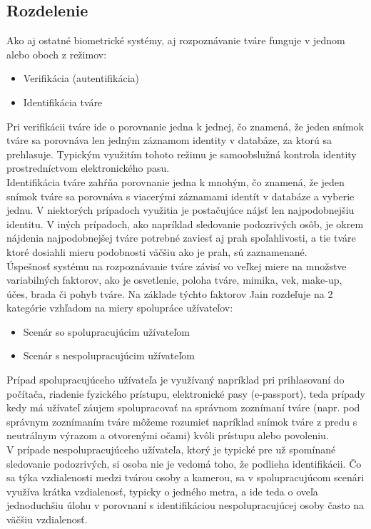 \subsection{Rozdelenie}
Ako aj ostatné biometrické systémy, aj rozpoznávanie tváre funguje v jednom alebo oboch z režimov:

\begin{itemize}
	\item Verifikácia (autentifikácia)
	\item Identifikácia tváre
\end{itemize}

Pri verifikácii tváre ide o porovnanie jedna k jednej, čo znamená, že jeden snímok tváre sa porovnáva len jedným záznamom identity v databáze, za ktorú sa prehlasuje.
Typickým využitím tohoto režimu je samoobslužná kontrola identity prostredníctvom elektronického pasu\cite{handbookface}.\\
\indent Identifikácia tváre zahŕňa porovnanie jedna k mnohým, čo znamená, že jeden snímok tváre sa porovnáva s viacerými záznamami identít v databáze a vyberie jednu\cite{handbookface}.
V niektorých prípadoch využitia je postačujúce nájsť len najpodobnejšiu identitu.
V iných prípadoch, ako napríklad sledovanie podozrivých osôb,
je okrem nájdenia najpodobnejšej tváre potrebné zaviesť aj prah spoľahlivosti, a tie tváre ktoré dosiahli mieru podobnosti väčšiu ako je prah, sú zaznamenané.\\
\indent Úspešnosť systému na rozpoznávanie tváre závisí vo veľkej miere na množstve variabilných faktorov, ako je osvetlenie, poloha tváre, mimika, vek, make-up, účes,
brada či pohyb tváre. Na základe týchto faktorov Jain rozdeľuje\cite{handbookface} na 2 kategórie vzhľadom na miery spolupráce užívateľov:

\begin{itemize}
	\item Scenár so spolupracujúcim užívateľom
	\item Scenár s nespolupracujúcim užívateľom
\end{itemize}

\indent Prípad spolupracujúceho užívateľa je využívaný napríklad pri prihlasovaní do počítača, riadenie fyzického prístupu, elektronické pasy (e-passport), teda prípady kedy má
užívateľ záujem spolupracovať na správnom zoznímaní tváre (napr. pod správnym zoznímaním tváre môžeme rozumieť napríklad snímok tváre z predu s neutrálnym výrazom a otvorenými očami)
kvôli prístupu alebo povoleniu.\\
\indent V prípade nespolupracujúceho užívateľa, ktorý je typické pre už spomínané sledovanie podozrivých, si osoba nie je vedomá toho, že podlieha identifikácii.
Čo sa týka vzdialenosti
medzi tvárou osoby a kamerou, sa v spolupracujúcom scenári využíva krátka vzdialenosť, typicky o jedného metra, a ide teda o oveľa jednoduchšiu úlohu v porovnaní s identifikáciou
nespolupracujúcej osoby často na väčšiu vzdialenosť.


